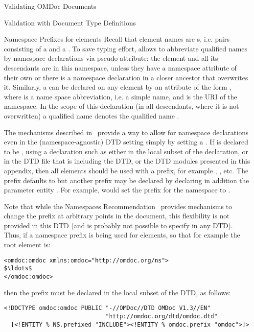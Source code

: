 \begin{tchapter}[id=validating]{Validating OMDoc Documents}
\begin{tsection}[id=validate-dtd]{Validation with Document Type Definitions}
\begin{tsubsection}[id=namespace-magic]{Namespace Prefixes for {\omdoc} elements}
  Recall that element names are  {s}, i.e. pairs
  consisting of a {} and a {}. To save typing
  effort, {\xml} allows to abbreviate qualified names by namespace declarations via
  {} pseudo-attribute: the element and all its descendants are in this
  namespace, unless they have a namespace attribute of their own or there is a namespace
  declaration in a closer ancestor that overwrites it.  Similarly, a
  {} can be declared on any element by an attribute of
  the form {}, where {} is a name space
  abbreviation, i.e. a simple name, and {} is the URI of the namespace.  In
  the scope of this declaration (in all descendants, where it is not overwritten) a
  qualified name {} denotes the qualified name {}.

  The mechanisms described in~\cite{AltBou:mox01} provide a way to allow for namespace
  declarations even in the (namespace-agnostic) DTD setting simply by setting a
  {}. If {} is declared to be
  {}, using a declaration such as {} either in the local subset of the {} declaration, or
  in the DTD file that is including the {\omdoc} DTD, or the DTD modules presented in this
  appendix, then all {\omdoc} elements should be used with a prefix, for example
  {}, {}, etc. The prefix defaults to
  {} but another prefix may be declared by declaring in addition the
  parameter entity {}. For example, {} would set the prefix for the {\omdoc} namespace to
  {}.

Note that while the Namespaces Recommendation~\cite{BraHol:xmlns99} provides
mechanisms to change the prefix at arbitrary points in the document, this
flexibility is not provided in this DTD (and is probably not possible to specify
in any DTD).  Thus, if a namespace prefix is being used for {\omdoc} elements, so
that for example the root element is:
\begin{lstlisting}[index={omdoc:omdoc},mathescape]
<omdoc:omdoc xmlns:omdoc="http://omdoc.org/ns">
$\ldots$
</omdoc:omdoc>
\end{lstlisting}
then the prefix must be declared in the local subset of the DTD, as follows:
\begin{lstlisting}[index={omdoc:omdoc,DOCTYPE,ENTITY,NS.prefixed,INCLUDE}]
<!DOCTYPE omdoc:omdoc PUBLIC "-//OMDoc//DTD OMDoc V1.3//EN"
                             "http://omdoc.org/dtd/omdoc.dtd"
  [<!ENTITY % NS.prefixed "INCLUDE"><!ENTITY % omdoc.prefix "omdoc">]>
\end{lstlisting}


\end{tsubsection}
\end{tsection}
\end{tchapter}
